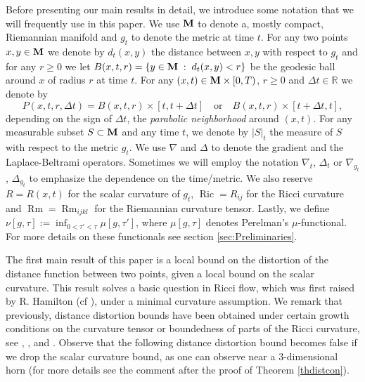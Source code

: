 \documentclass[11pt]{amsart}
\numberwithin{equation}{section}
\newcommand{\IR}{\mathbb{R}}
\def\M{{\bf M}}
\DeclareMathOperator{\Ric}{Ric}
\DeclareMathOperator{\Rm}{Rm}
\numberwithin{equation}{section}
\begin{document}
Before presenting our main results in detail, we introduce some notation that we will frequently use in this paper. 
We use $\M$ to denote a, mostly compact, Riemannian manifold and $g_t$ to denote the metric at time $t$.
For any two points $x, y \in \M$ we denote by $d_t (x,y)$ the distance between $x, y$ with respect to $g_t$ and for any $r \geq 0$ we let $B(x, t, r) = \{ y \in \M \; : \;  d_t (x,y) < r \}$ be the geodesic ball around $x$ of radius $r$ at time $t$.
For any $(x,t) \in \M \times [0,T)$, $r \geq 0$ and $\Delta t \in \IR$ we denote by
\[ P(x,t, r, \Delta t) = B(x,t,r) \times [t, t+ \Delta t] \quad \text{or} \quad B(x,t,r) \times [t + \Delta t, t], \]
depending on the sign of $\Delta t$, the \emph{parabolic neighborhood} around $(x,t)$.
For any measurable subset $S \subset \M$ and any time $t$, we denote by $|S|_t$ the measure of $S$ with respect to the metric $g_t$.
We use $\nabla$ and $\Delta$ to denote the gradient and the Laplace-Beltrami operators.  
Sometimes we will employ the notation $\nabla_t$, $\Delta_t$ or $\nabla_{g_t}$, $\Delta_{g_t}$ to emphasize the dependence on the time/metric.
We also reserve $R=R(x, t)$ for the scalar curvature of $g_t$, $\Ric = R_{ij}$ for the Ricci curvature and $\Rm = \Rm_{ijkl}$ for the Riemannian curvature tensor.
Lastly, we define $\nu [ g, \tau ] := \inf_{0 < \tau' < \tau} \mu [g, \tau']$, where $\mu [g,\tau]$ denotes Perelman's $\mu$-functional.
For more details on these functionals see section \ref{sec:Preliminaries}.

The first main result of this paper is a local bound on the distortion of the distance function between two points, given a local bound on the scalar curvature.
This result solves a basic question in Ricci flow, which was first raised by R. Hamilton (cf \cite[section 17]{Ha:1}), under a minimal curvature assumption.
We remark that previously, distance distortion bounds have been obtained under certain growth conditions on the curvature tensor or boundedness of parts of the Ricci curvature, see  \cite[section 17]{Ha:1},  \cite[Lemma 8.3]{P:1}, \cite{Si:1} and \cite{Tian-Wang}.
Observe that the following distance distortion bound becomes false if we drop the scalar curvature bound, as one can observe near a $3$-dimensional horn (for more details see the comment after the proof of Theorem \ref{thdistcon}).
\end{document}
